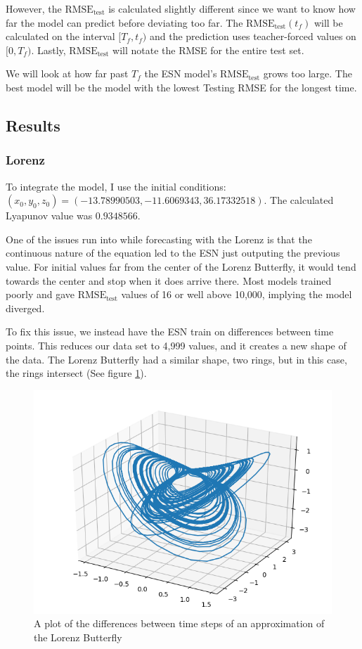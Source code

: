 \documentclass{article}
\begin{document}
However, the $\text{RMSE}_\text{test}$ is calculated slightly different
since we want to know how far the model can predict before deviating too
far. The $\text{RMSE}_\text{test}(t_f)$ will be calculated on the interval
$[T_f, t_f)$ and the prediction uses teacher-forced values on $[0, T_f)$.
Lastly, $\text{RMSE}_\text{test}$ will notate the RMSE for the entire test
set.

We will look at how far past $T_f$ the ESN model's
$\text{RMSE}_\text{test}$ grows too large. The best model will be the 
model with the lowest Testing RMSE for the longest time.

\subsection{Results}
\subsubsection{Lorenz}

To integrate the model, I use the initial conditions:
$(x_0, y_0, z_0) = (-13.78990503, -11.6069343, 36.17332518)$. The calculated Lyapunov value was $0.9348566$. 

One of the issues run into while forecasting with the Lorenz is that the
continuous nature of the equation led to the ESN just outputing the
previous value. For initial values far from the center of the Lorenz
Butterfly, it would tend towards the center and stop when it does arrive
there. Most models trained poorly and gave $\text{RMSE}_\text{test}$
values of 16 or well above 10,000, implying the model diverged.

To fix this issue, we instead have the ESN train on differences between
time points. This reduces our data set to 4,999 values, and it creates
a new shape of the data. The Lorenz Butterfly had a similar shape, two rings, but in this case, the rings intersect (See figure \ref{fig:lorenz_diff}).

\begin{figure}[H]
    \centering
    \includegraphics[width=.5\linewidth]{doc/paper/images/lorenz/full_differential.png}
    \caption{A plot of the differences between time steps of an approximation of the Lorenz Butterfly}
    \label{fig:lorenz_diff}
\end{figure}
\end{document}
